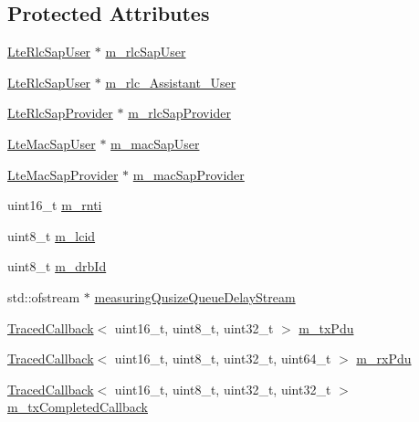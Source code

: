 \subsection*{Protected Attributes}
\begin{DoxyCompactItemize}
\item 
\hyperlink{classns3_1_1LteRlcSapUser}{Lte\+Rlc\+Sap\+User} $\ast$ \hyperlink{classns3_1_1LteRlc_a0156774a917567c2cee1f353d56dfffa}{m\+\_\+rlc\+Sap\+User}
\item 
\hyperlink{classns3_1_1LteRlcSapUser}{Lte\+Rlc\+Sap\+User} $\ast$ \hyperlink{classns3_1_1LteRlc_a7f2904aaf198cd72f2ea11c3350a2026}{m\+\_\+rlc\+\_\+\+Assistant\+\_\+\+User}
\item 
\hyperlink{classns3_1_1LteRlcSapProvider}{Lte\+Rlc\+Sap\+Provider} $\ast$ \hyperlink{classns3_1_1LteRlc_a5e95af096d5288022afed321082ddbdc}{m\+\_\+rlc\+Sap\+Provider}
\item 
\hyperlink{classns3_1_1LteMacSapUser}{Lte\+Mac\+Sap\+User} $\ast$ \hyperlink{classns3_1_1LteRlc_a626a8545a8db56cda0da3e070f6e37a8}{m\+\_\+mac\+Sap\+User}
\item 
\hyperlink{classns3_1_1LteMacSapProvider}{Lte\+Mac\+Sap\+Provider} $\ast$ \hyperlink{classns3_1_1LteRlc_a69272d17c4e48183bb89b8dd0660c1be}{m\+\_\+mac\+Sap\+Provider}
\item 
uint16\+\_\+t \hyperlink{classns3_1_1LteRlc_a48ab0a78e7f2687337075b1c8832df70}{m\+\_\+rnti}
\item 
uint8\+\_\+t \hyperlink{classns3_1_1LteRlc_a051085e9b27883e7ba4b98ad7242fd8a}{m\+\_\+lcid}
\item 
uint8\+\_\+t \hyperlink{classns3_1_1LteRlc_a34002cd9652c321a6c5279c97cfbe2ad}{m\+\_\+drb\+Id}
\item 
std\+::ofstream $\ast$ \hyperlink{classns3_1_1LteRlc_a40a539b080df8c617ca62325696cfe20}{measuring\+Qusize\+Queue\+Delay\+Stream}
\item 
\hyperlink{classns3_1_1TracedCallback}{Traced\+Callback}$<$ uint16\+\_\+t, uint8\+\_\+t, uint32\+\_\+t $>$ \hyperlink{classns3_1_1LteRlc_aa14f9d8b8828d0b0859f1870ae1248e6}{m\+\_\+tx\+Pdu}
\item 
\hyperlink{classns3_1_1TracedCallback}{Traced\+Callback}$<$ uint16\+\_\+t, uint8\+\_\+t, uint32\+\_\+t, uint64\+\_\+t $>$ \hyperlink{classns3_1_1LteRlc_a5a2491726597ab3cb02655b34dca0722}{m\+\_\+rx\+Pdu}
\item 
\hyperlink{classns3_1_1TracedCallback}{Traced\+Callback}$<$ uint16\+\_\+t, uint8\+\_\+t, uint32\+\_\+t, uint32\+\_\+t $>$ \hyperlink{classns3_1_1LteRlc_aa6cf9c6ecdd5efc7dacb99d4042037d9}{m\+\_\+tx\+Completed\+Callback}

\end{DoxyCompactItemize}
